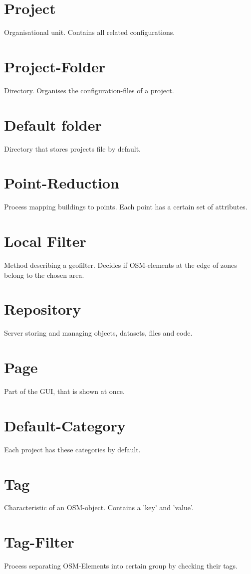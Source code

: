 \documentclass[parskip=full]{report} %
\begin{document}
\section*{Project}
Organisational unit. Contains all related configurations.

\section*{Project-Folder}
Directory. Organises the configuration-files of a project.

\section*{Default folder}
Directory that stores projects file by default.

\section*{Point-Reduction}
Process mapping buildings to points. Each point has a certain set of attributes.

\section*{Local Filter}
Method describing a geofilter. Decides if OSM-elements at the edge of zones belong to the chosen area. 

\section*{Repository}
Server storing and managing objects, datasets, files and code.

\section*{Page}
Part of the GUI, that is shown at once.

\section*{Default-Category}
Each project has these categories by default.

\section*{Tag}
Characteristic of an OSM-object. Contains a 'key' and 'value'.

\section*{Tag-Filter}
Process separating OSM-Elements into certain group by checking their tags.
\end{document}
